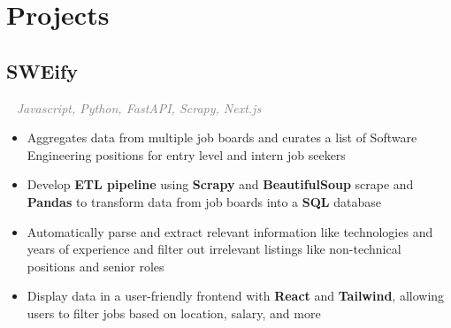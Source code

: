 \documentclass{article}
\newcommand{\resumesection}[3]{
    \subsection*{#1}
    \ 
    \normalsize
    \normalsize
    \hfill
    \textcolor{black}{#3}
    \normalsize
    \newline
    \small
    \textcolor{grey}{\emph{#2}}
}
\begin{document}
\section*{Projects}
\resumesection{SWEify}{Javascript, Python, FastAPI, Scrapy, Next.js}{}
\begin{itemize}
	\item Aggregates data from multiple job boards and curates a list of Software Engineering positions for entry level and intern job seekers
	\item Develop \textbf{ETL pipeline} using \textbf{Scrapy} and \textbf{BeautifulSoup} scrape and \textbf{Pandas} to transform data from job boards into a \textbf{SQL} database
	\item Automatically parse and extract relevant information like technologies and years of experience and filter out irrelevant listings like non-technical positions and senior roles
	\item Display data in a user-friendly frontend with \textbf{React} and \textbf{Tailwind}, allowing users to filter jobs based on location, salary, and more
\end{itemize}
\end{document}
